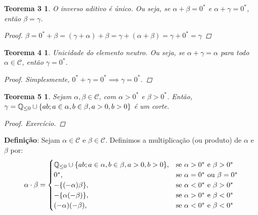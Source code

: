 \documentclass[a4paper,12pt]{article}
\newtheorem*{t3}{Teorema 3}
\newtheorem*{t4}{Teorema 4}
\newtheorem*{t5}{Teorema 5}
\begin{document}
	\begin{t3}
		
		O inverso aditivo é único. Ou seja, se $\alpha + \beta = 0^*$ e $\alpha + \gamma = 0^*$, então $\beta = \gamma$.
		
		\begin{proof}
			
			$\beta = 0^* + \beta = (\gamma + \alpha) + \beta = \gamma + (\alpha + \beta) = \gamma + 0^* = \gamma$
			
		\end{proof}
		
	\end{t3}

	\begin{t4}
		
		Unicidade do elemento neutro. Ou seja, se $\alpha + \gamma = \alpha$ para todo $\alpha \in \mathcal C$, então $\gamma = 0^*$.
		
		\begin{proof}
			
			Simplesmente, $0^* + \gamma = 0^* \implies \gamma = 0^*$.
			
		\end{proof}
		
	\end{t4}


	\begin{t5}
		
		Sejam $\alpha, \beta \in \mathcal C$, com $\alpha > 0^*$ e $\beta > 0^*$. Então, $\gamma = \Bbb Q_{\leq 0} \cup \{ab; a \in \alpha, b \in \beta, a > 0, b > 0\}$ é um corte. 
		
		\begin{proof}
			
			Exercício.
			
		\end{proof}
		
	\end{t5}

\textbf{Definição}: Sejam $\alpha \in \mathcal C$ e $\beta \in \mathcal C$. Definimos a multiplicação (ou produto) de $\alpha$ e $\beta$ por:
\\
	\begin{equation} \alpha \cdot \beta =
		\begin{cases}
			\Bbb Q_{\leq 0} \cup \{ab; a \in \alpha, b \in \beta, a > 0, b > 0\},  & \text{se $\alpha > 0^*$ e $\beta > 0^*$} \\
			0^*, & \text{se $\alpha = 0^*$ ou $\beta = 0^*$} \\
			-\{(-\alpha)\beta\}, & \text{se $\alpha < 0^*$ e $\beta > 0^*$} \\
			-\{\alpha(-\beta)\}, & \text{se $\alpha > 0^*$ e $\beta < 0^*$} \\
			(-\alpha)(-\beta), & \text{se $\alpha < 0^*$ e $\beta < 0^*$}
		\end{cases}
	\end{equation}
\end{document}

